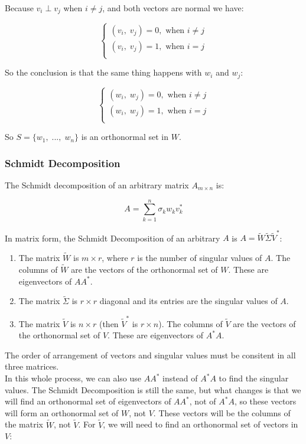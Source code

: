 Because $v_i \perp v_j$ when $i\neq j$, and both vectors are normal we have:

    $$\begin{cases}
      (v_i,\;v_j)=0,\text{ when }i\neq j\\
      (v_i,\;v_j)=1,\text{ when }i= j\\
    \end{cases}$$
    
So the conclusion is that the same thing happens with $w_i$ and $w_j$:

    $$\begin{cases}
      (w_i,\;w_j)=0,\text{ when }i\neq j\\
      (w_i,\;w_j)=1,\text{ when }i= j\\
    \end{cases}$$

So $S=\{w_1,\;...,\;w_n\}$ is an orthonormal set in $W$.

\subsubsection*{Schmidt Decomposition}

The Schmidt decomposition of an arbitrary matrix $A_{m \times n}$ is:

$$A=\sum_{k=1}^n\sigma_kw_kv_k^*$$

In matrix form, the Schmidt Decomposition of an arbitrary $A$ is $A=\widetilde{W}\widetilde{\Sigma} \widetilde{V}^*$:

\begin{enumerate}[label=(\roman*)]
    \item The matrix $\widetilde{W}$ is $m\times r$, where $r$ is the number of singular values of $A$. The columns of $\widetilde{W}$ are the vectors of the orthonormal set of $W$. These are eigenvectors of $AA^*$.
    \item The matrix $\widetilde{\Sigma}$ is $r\times r$ diagonal and its entries are the singular values of $A$.
    \item The matrix $\widetilde{V}$ is $n\times r$ (then $\widetilde{V}^*$ is $r\times n$). The columns of $\widetilde{V}$ are the vectors of the orthonormal set of $V$. These are eigenvectors of $A^*A$.
\end{enumerate}

The order of arrangement of vectors and singular values must be consitent in all three matrices.\\

In this whole process, we can also use $AA^*$ instead of $A^*A$ to find the singular values. The Schmidt Decomposition is still the same, but what changes is that we will find an orthonormal set of eigenvectors of $AA^*$, not of $A^*A$, so these vectors will form an orthonormal set of $W$, not $V$. These vectors will be the columns of the matrix $\widetilde{W}$, not $\widetilde{V}$. For $\widetilde{V}$, we will need to find an orthonormal set of vectors in $V$:

